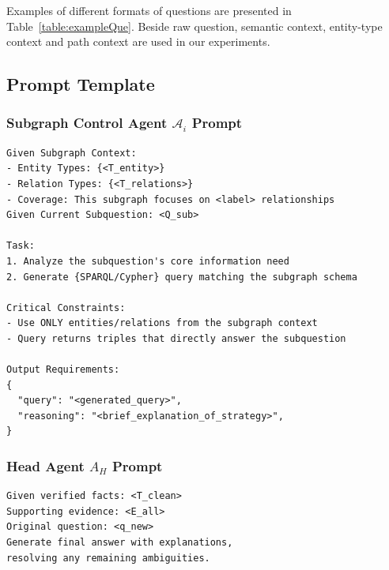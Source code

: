 \documentclass[sigconf]{acmart}
\begin{document}
Examples of different formats of questions are presented in Table~\ref{table:exampleQue}. Beside raw question, semantic context, entity-type context and path context are used in our experiments.



\subsection{Prompt Template}

\subsubsection{Subgraph Control Agent $\mathcal{A}_i$ Prompt}
\begin{verbatim}
Given Subgraph Context:
- Entity Types: {<T_entity>}
- Relation Types: {<T_relations>}
- Coverage: This subgraph focuses on <label> relationships
Given Current Subquestion: <Q_sub>

Task:
1. Analyze the subquestion's core information need
2. Generate {SPARQL/Cypher} query matching the subgraph schema 

Critical Constraints:
- Use ONLY entities/relations from the subgraph context
- Query returns triples that directly answer the subquestion

Output Requirements:
{
  "query": "<generated_query>",
  "reasoning": "<brief_explanation_of_strategy>",
}
\end{verbatim}

\subsubsection{Head Agent $A_{H}$ Prompt}
\begin{verbatim}
Given verified facts: <T_clean> 
Supporting evidence: <E_all>
Original question: <q_new>
Generate final answer with explanations, 
resolving any remaining ambiguities.
\end{verbatim}


\end{document}
